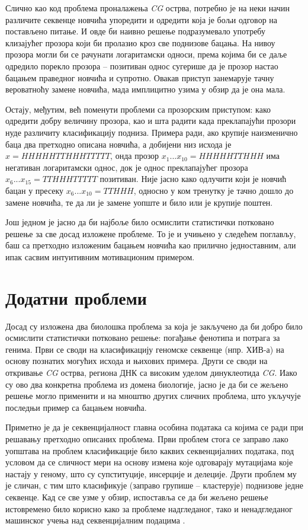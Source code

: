 \documentclass[12pt,oneside]{memoir}
\begin{document}
\begin{CJK}{UTF8}{ipxm}
Слично као код проблема проналажења \textit{CG} острва, потребно је на неки начин различите секвенце новчића упоредити и одредити која је бољи одговор на постављено питање. И овде би наивно решење подразумевало употребу клизајућег прозора који би пролазио кроз све поднизове бацања. На нивоу прозора могли би се рачунати логаритамски односи, према којима би се даље одредило порекло прозора -- позитиван однос сугерише да је прозор настао бацањем праведног новчића и супротно. Овакав приступ занемарује тачну вероватноћу замене новчића, мада имплицитно узима у обзир да је она мала.

Остају, међутим, већ поменути проблеми са прозорским приступом: како одредити добру величину прозора, као и шта радити када преклапајући прозори нуде различиту класификацију подниза. Примера ради, ако крупије наизменично баца два претходно описана новчића, а добијени низ исхода је $x = HHHHHTTHHHTTTTT$, онда прозор $x_1...x_{10} = HHHHHTTHHH$ има негативан логаритамски однос, док је однос преклапајућег прозора $x_6...x_{15} = TTHHHTTTTT$ позитиван. Није јасно како одлучити који је новчић бацан у пресеку $x_6...x_{10} = TTHHH$, односно у ком тренутку је тачно дошло до замене новчића, те да ли је замене уопште и било или је крупије поштен.

Још једном је јасно да би најбоље било осмислити статистички потковано решење за све досад изложене проблеме. То је и учињено у следећем поглављу, баш са претходно изложеним бацањем новчића као прилично једноставним, али ипак сасвим интуитивним мотивационим примером.

\section{Додатни проблеми}
Досад су изложена два биолошка проблема за која је закључено да би добро било осмислити статистички потковано решење: погађање фенотипа и потрага за генима. Први се своди на класификацију геномске секвенце (нпр. ХИВ-а) на основу познатих могућих исхода и њихових примера. Други се своди на откривање \textit{CG} острва, региона ДНК са високим уделом динуклеотида \textit{CG}. Иако су ово два конкретна проблема из домена биологије, јасно је да би се жељено решење могло применити и на мноштво других сличних проблема, што укључује последњи пример са бацањем новчића.

Приметно је да је секвенцијалност главна особина података са којима се ради при решавању претходно описаних проблема. Први проблем стога се заправо лако уопштава на проблем класификације било каквих секвенцијалних података, под условом да се сличност мери на основу измена које одговарају мутацијама које настају у геному, што су супституције, инсерције и делеције. Други проблем му је сличан, с тим што класификује (заправо групише -- кластерује) поднизове једне секвенце. Кад се све узме у обзир, испоставља се да би жељено решење истовремено било корисно како за проблеме надгледаног, тако и ненадгледаног машинског учења над секвенцијалним подацима \cite{khoda2014}.


\end{CJK}
\end{document}
